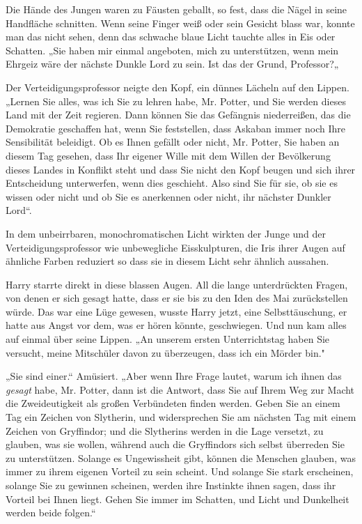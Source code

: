 {Die Hände des Jungen waren zu Fäusten geballt, so fest, dass die Nägel in seine Handfläche schnitten. Wenn seine Finger weiß oder sein Gesicht blass war, konnte man das nicht sehen, denn das schwache blaue Licht tauchte alles in Eis oder Schatten. „Sie haben mir einmal angeboten, mich zu unterstützen, wenn mein Ehrgeiz wäre der nächste Dunkle Lord zu sein. Ist das der Grund, Professor?„

Der Verteidigungsprofessor neigte den Kopf, ein dünnes Lächeln auf den Lippen. „Lernen Sie alles, was ich Sie zu lehren habe, Mr. Potter, und Sie werden dieses Land mit der Zeit regieren. Dann können Sie das Gefängnis niederreißen, das die Demokratie geschaffen hat, wenn Sie feststellen, dass Askaban immer noch Ihre Sensibilität beleidigt. Ob es Ihnen gefällt oder nicht, Mr. Potter, Sie haben an diesem Tag gesehen, dass Ihr eigener Wille mit dem Willen der Bevölkerung dieses Landes in Konflikt steht und dass Sie nicht den Kopf beugen und sich ihrer Entscheidung unterwerfen, wenn dies geschieht. Also sind Sie für sie, ob sie es wissen oder nicht und ob Sie es anerkennen oder nicht, ihr nächster Dunkler Lord“.

In dem unbeirrbaren, monochromatischen Licht wirkten der Junge und der Verteidigungsprofessor wie unbewegliche Eisskulpturen, die Iris ihrer Augen auf ähnliche Farben reduziert so dass sie in diesem Licht sehr ähnlich aussahen.

Harry starrte direkt in diese blassen Augen. All die lange unterdrückten Fragen, von denen er sich gesagt hatte, dass er sie bis zu den Iden des Mai zurückstellen würde. Das war eine Lüge gewesen, wusste Harry jetzt, eine Selbsttäuschung, er hatte aus Angst vor dem, was er hören könnte, geschwiegen. Und nun kam alles auf einmal über seine Lippen. „An unserem ersten Unterrichtstag haben Sie versucht, meine Mitschüler davon zu überzeugen, dass ich ein Mörder bin."

„Sie sind einer.“ Amüsiert. „Aber wenn Ihre Frage lautet, warum ich ihnen das \emph{gesagt} habe, Mr. Potter, dann ist die Antwort, dass Sie auf Ihrem Weg zur Macht die Zweideutigkeit als großen Verbündeten finden werden. Geben Sie an einem Tag ein Zeichen von Slytherin, und widersprechen Sie am nächsten Tag mit einem Zeichen von Gryffindor; und die Slytherins werden in die Lage versetzt, zu glauben, was sie wollen, während auch die Gryffindors sich selbst überreden Sie zu unterstützen. Solange es Ungewissheit gibt, können die Menschen glauben, was immer zu ihrem eigenen Vorteil zu sein scheint. Und solange Sie stark erscheinen, solange Sie zu gewinnen scheinen, werden ihre Instinkte ihnen sagen, dass ihr Vorteil bei Ihnen liegt. Gehen Sie immer im Schatten, und Licht und Dunkelheit werden beide folgen.“

}

